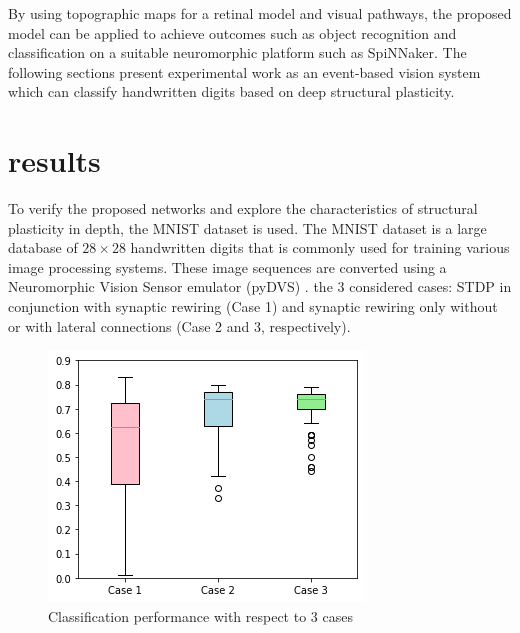 \documentclass{article}
\begin{document}
By using topographic maps for a retinal model and visual pathways, the proposed model can be applied to achieve outcomes such as object recognition and classification on a suitable neuromorphic platform such as SpiNNaker.
The following sections present experimental work as an event-based vision system which can classify handwritten digits based on deep structural plasticity.

\section{results}\label{section:results}

To verify the proposed networks and explore the characteristics of structural plasticity in depth, the MNIST dataset is used. 
The MNIST dataset is a large database of $28 \times 28$ handwritten digits that is commonly used for training various image processing systems. 
These image sequences are converted using a Neuromorphic Vision Sensor emulator (pyDVS) \cite{garcia2016pydvs}.
the 3 considered cases: STDP in conjunction with synaptic rewiring (Case 1) and synaptic rewiring only without or with lateral connections (Case 2 and 3, respectively).

\begin{figure}[tbh]
    \centering
    \includegraphics[width=0.80\linewidth, trim=0cm 0cm 0cm 0cm, clip=true]{10trials/boxPlotCase}
    \caption{Classification performance with respect to 3 cases}
    \label{fig:bpWCases}
\end{figure}
\end{document}
